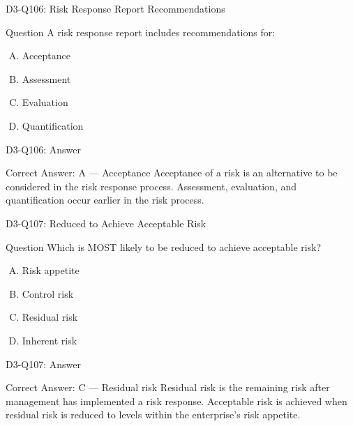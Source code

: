 \documentclass{beamer}
\begin{document}
	\begin{frame}{D3-Q106: Risk Response Report Recommendations}
		\begin{block}{Question}
			A risk response report includes recommendations for:
		\end{block}
		\begin{enumerate}[(A)]
			\item Acceptance
			\item Assessment
			\item Evaluation
			\item Quantification
		\end{enumerate}
	\end{frame}
	\begin{frame}{D3-Q106: Answer}
		\begin{block}{Correct Answer: A --- Acceptance}
			Acceptance of a risk is an alternative to be considered in the risk response process. Assessment, evaluation, and quantification occur earlier in the risk process.
		\end{block}
	\end{frame}
	
	\begin{frame}{D3-Q107: Reduced to Achieve Acceptable Risk}
		\begin{block}{Question}
			Which is MOST likely to be reduced to achieve acceptable risk?
		\end{block}
		\begin{enumerate}[(A)]
			\item Risk appetite
			\item Control risk
			\item Residual risk
			\item Inherent risk
		\end{enumerate}
	\end{frame}
	\begin{frame}{D3-Q107: Answer}
		\begin{block}{Correct Answer: C --- Residual risk}
			Residual risk is the remaining risk after management has implemented a risk response. Acceptable risk is achieved when residual risk is reduced to levels within the enterprise's risk appetite.
		\end{block}
	\end{frame}
	
\end{document}
